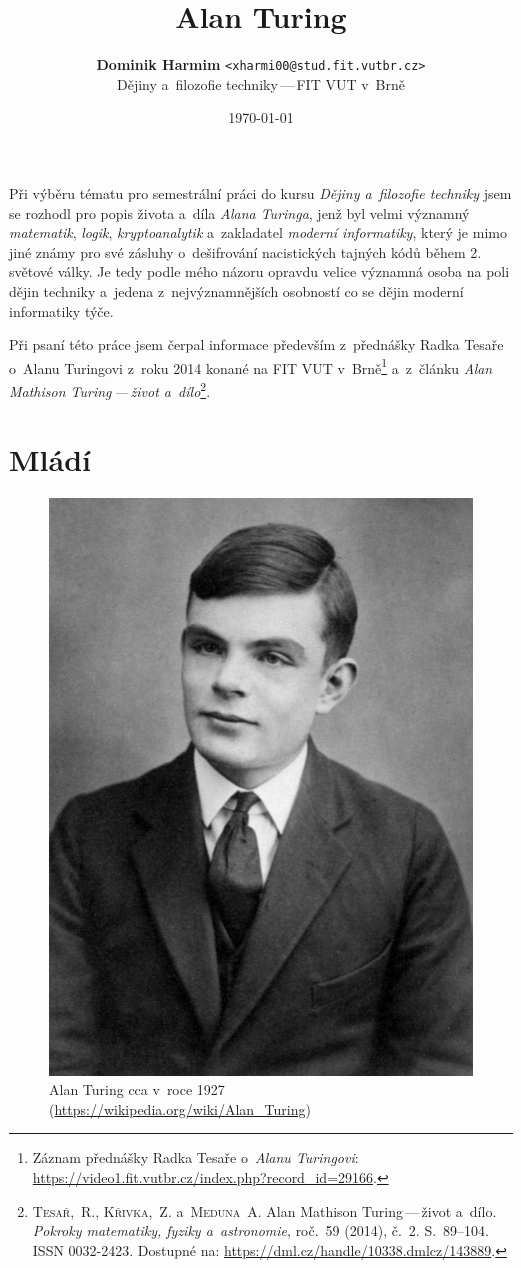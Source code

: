 \documentclass[a4paper, 11pt]{article}
\title{\vspace{-4em}Alan Turing\vspace{-.5em}}
\author{%
    \textbf{Dominik Harmim} \texttt{<xharmi00@stud.fit.vutbr.cz>} \\
    Dějiny a~filozofie techniky\,---\,FIT VUT v~Brně%
}
\date{\vspace{-.5em}\today\vspace{-1em}}
\begin{document}
\maketitle


Při výběru tématu pro semestrální práci do kursu \emph{Dějiny a~filozofie
techniky} jsem se rozhodl pro popis života a~díla \emph{Alana Turinga},
jenž byl velmi významný \emph{matematik}, \emph{logik},
\emph{kryptoanalytik} a~zakladatel \emph{moderní informatiky}, který je mimo
jiné známy pro své zásluhy o~dešifrování nacistických tajných kódů během 2.
světové války. Je tedy podle mého názoru opravdu velice významná osoba na
poli dějin techniky a~jedena z~nejvýznamnějších osobností co se dějin moderní
informatiky týče.

Při psaní této práce jsem čerpal informace především z~přednášky Radka Tesaře
o~Alanu Turingovi z~roku 2014 konané na FIT VUT v~Brně\footnote{Záznam
přednášky Radka Tesaře o~\emph{Alanu Turingovi}:
\url{https://video1.fit.vutbr.cz/index.php?record_id=29166}.} a~z~článku
\emph{Alan Mathison Turing\,---\,život a~dílo}\footnote{\textsc{Tesař,~R.},
\textsc{Křivka,~Z.} a~\textsc{Meduna~A.} Alan Mathison Turing\,---\,život
a~dílo. \textit{Pokroky matematiky, fyziky a~astronomie}, roč.~59 (2014),
č.~2. S.~89--104. ISSN 0032-2423. Dostupné na:
\url{https://dml.cz/handle/10338.dmlcz/143889}.}.


\section{Mládí}

\begin{figure}
    \centering
    \includegraphics[width=.7 \linewidth]{turing.jpg}
    \caption{%
        Alan Turing cca v~roce 1927 \\
        \tiny{(\url{https://wikipedia.org/wiki/Alan_Turing})}%
    }
    \label{fig:turing}
\end{figure}
\end{document}
